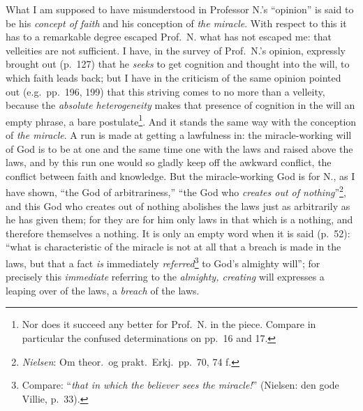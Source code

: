 \documentclass[12pt,a4paper]{book}
\begin{document}
What I am supposed to have misunderstood in Professor N.'s ``opinion'' is said
to be his \emph{concept of faith} and his conception of \emph{the miracle}.
With respect to this it has to a remarkable degree escaped Prof.\ N. what has
not escaped me: that velleities are not sufficient. I have, in the survey of
Prof.\ N.'s opinion, expressly brought out (p.\ 127) that he \emph{seeks} to
get cognition and thought into the will, to which faith leads back; but I have
in the criticism of the same opinion pointed out (e.g.\ pp.\ 196, 199) that
this striving comes to no more than a velleity, because the \emph{absolute
heterogeneity} makes that presence of cognition in the will an empty phrase, a
bare postulate\footnote{%
  Nor does it succeed any better for Prof.\ N. in the piece. Compare in
  particular the confused determinations on pp.\ 16 and 17.}.
And it stands the same way with the conception of \emph{the miracle}. A run is
made at getting a lawfulness in: the miracle-working will of God is to be at
one and the same time one with the laws and raised above the laws, and by this
run one would so gladly keep off the awkward conflict, the conflict between
faith and knowledge. But the miracle-working God is for N., as I have shown,
``the God of arbitrariness,'' ``the God who \emph{creates out of
nothing}''\footnote{%
  \emph{Nielsen}: Om theor.\ og prakt.\ Erkj.\ pp.\ 70, 74 f.}, and this God
who creates out of nothing abolishes the laws just as arbitrarily as he has
given them; for they are for him only laws in that which is a nothing, and
therefore themselves a nothing.
It is only an empty word when it is said (p.\ 52): ``what is characteristic of
the miracle is not at all that a breach is made in the laws, but that a fact
\emph{is} immediately \emph{referred}\footnote{%
  Compare: ``\emph{that in which the believer sees the miracle!}'' (Nielsen:
  den gode Villie, p.\ 33).} to God's almighty
will''; for precisely this \emph{immediate} referring to the \emph{almighty,
creating} will expresses a leaping over of the laws, a \emph{breach} of the
laws.
\end{document}
